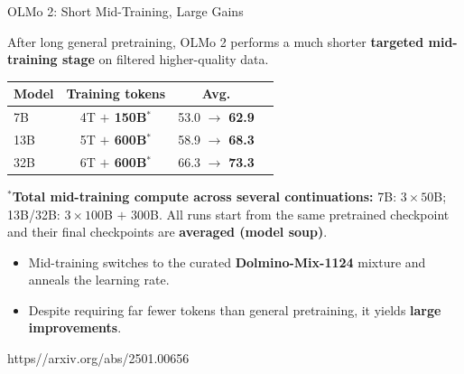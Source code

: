\documentclass[11pt,compress,t,notes=noshow, xcolor=table]{beamer}
\begin{document}

\begin{vbframe}{OLMo 2: Short Mid-Training, Large Gains}

After long general pretraining, OLMo 2 performs a much shorter
\textbf{targeted mid-training stage} on filtered higher-quality data.

\vspace{0.15cm}

\begin{center}
\begin{tabular}{lccc}
\textbf{Model} & \textbf{Training tokens} & \textbf{Avg.}\\%
\hline
7B
& 4T \textbf{$+$ 150B$^\ast$}
& 53.0 $\rightarrow$ \textbf{62.9}\\%

13B
& 5T \textbf{$+$ 600B$^\ast$}
& 58.9 $\rightarrow$ \textbf{68.3}\\%

32B
& 6T \textbf{$+$ 600B$^\ast$}
& 66.3 $\rightarrow$ \textbf{73.3}\\%
\end{tabular}
\end{center}

\vspace{0.15cm}

{\scriptsize
$^\ast$\textbf{Total mid-training compute across several continuations:}
7B: $3\times 50$B;
13B/32B: $3\times 100$B $+$ 300B.
All runs start from the same pretrained checkpoint and their final
checkpoints are \textbf{averaged (model soup)}.
}

\vspace{0.25cm}

\begin{itemize}

    \item Mid-training switches to the curated
          \textbf{Dolmino-Mix-1124} mixture and anneals the learning rate.

    \item Despite requiring far fewer tokens than general pretraining,
          it yields \textbf{large improvements}.

\end{itemize}

{https\://arxiv.org/abs/2501.00656}

\end{vbframe}
\end{document}
